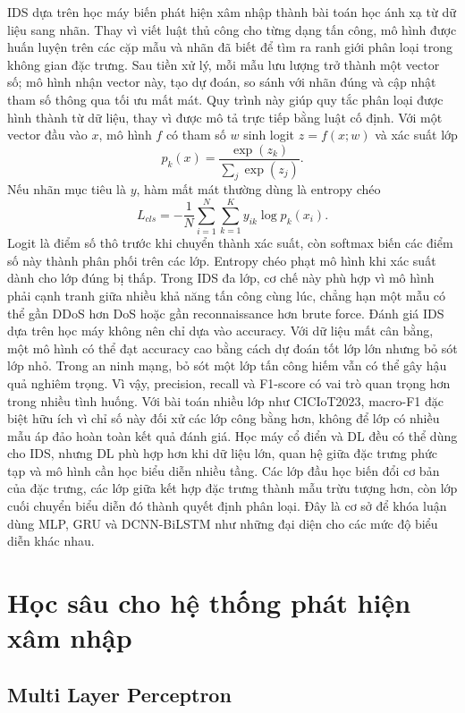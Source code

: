 IDS dựa trên học máy biến phát hiện xâm nhập thành bài toán học ánh xạ từ dữ liệu sang nhãn. Thay vì viết luật thủ công cho từng dạng tấn công, mô hình được huấn luyện trên các cặp mẫu và nhãn đã biết để tìm ra ranh giới phân loại trong không gian đặc trưng. Sau tiền xử lý, mỗi mẫu lưu lượng trở thành một vector số; mô hình nhận vector này, tạo dự đoán, so sánh với nhãn đúng và cập nhật tham số thông qua tối ưu mất mát. Quy trình này giúp quy tắc phân loại được hình thành từ dữ liệu, thay vì được mô tả trực tiếp bằng luật cố định.
\bigbreak\noindent
Với một vector đầu vào $x$, mô hình $f$ có tham số $w$ sinh logit $z=f(x;w)$ và xác suất lớp
$$
p_k(x)=\frac{\exp(z_k)}{\sum_j \exp(z_j)}.
$$
Nếu nhãn mục tiêu là $y$, hàm mất mát thường dùng là entropy chéo
$$
L_{cls}=-\frac{1}{N}\sum_{i=1}^{N}\sum_{k=1}^{K} y_{ik}\log p_k(x_i).
$$
Logit là điểm số thô trước khi chuyển thành xác suất, còn softmax biến các điểm số này thành phân phối trên các lớp. Entropy chéo phạt mô hình khi xác suất dành cho lớp đúng bị thấp. Trong IDS đa lớp, cơ chế này phù hợp vì mô hình phải cạnh tranh giữa nhiều khả năng tấn công cùng lúc, chẳng hạn một mẫu có thể gần DDoS hơn DoS hoặc gần reconnaissance hơn brute force.
\bigbreak\noindent
Đánh giá IDS dựa trên học máy không nên chỉ dựa vào accuracy. Với dữ liệu mất cân bằng, một mô hình có thể đạt accuracy cao bằng cách dự đoán tốt lớp lớn nhưng bỏ sót lớp nhỏ. Trong an ninh mạng, bỏ sót một lớp tấn công hiếm vẫn có thể gây hậu quả nghiêm trọng. Vì vậy, precision, recall và F1-score có vai trò quan trọng hơn trong nhiều tình huống. Với bài toán nhiều lớp như CICIoT2023, macro-F1 đặc biệt hữu ích vì chỉ số này đối xử các lớp công bằng hơn, không để lớp có nhiều mẫu áp đảo hoàn toàn kết quả đánh giá.
\bigbreak\noindent
Học máy cổ điển và DL đều có thể dùng cho IDS, nhưng DL phù hợp hơn khi dữ liệu lớn, quan hệ giữa đặc trưng phức tạp và mô hình cần học biểu diễn nhiều tầng. Các lớp đầu học biến đổi cơ bản của đặc trưng, các lớp giữa kết hợp đặc trưng thành mẫu trừu tượng hơn, còn lớp cuối chuyển biểu diễn đó thành quyết định phân loại. Đây là cơ sở để khóa luận dùng MLP, GRU và DCNN-BiLSTM như những đại diện cho các mức độ biểu diễn khác nhau.

\section{Học sâu cho hệ thống phát hiện xâm nhập}

\subsection{Multi Layer Perceptron}

